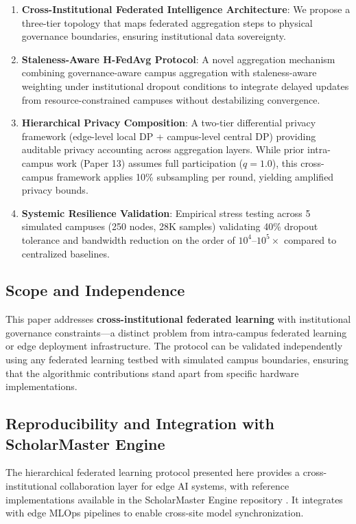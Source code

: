 \documentclass[conference]{IEEEtran}
\begin{document}
\begin{enumerate}
    \item \textbf{Cross-Institutional Federated Intelligence Architecture}: We propose a three-tier topology that maps federated aggregation steps to physical governance boundaries, ensuring institutional data sovereignty.
    \item \textbf{Staleness-Aware H-FedAvg Protocol}: A novel aggregation mechanism combining governance-aware campus aggregation with staleness-aware weighting under institutional dropout conditions to integrate delayed updates from resource-constrained campuses without destabilizing convergence.
    \item \textbf{Hierarchical Privacy Composition}: A two-tier differential privacy framework (edge-level local DP + campus-level central DP) providing auditable privacy accounting across aggregation layers. While prior intra-campus work (Paper 13) assumes full participation ($q=1.0$), this cross-campus framework applies 10\% subsampling per round, yielding amplified privacy bounds.
    \item \textbf{Systemic Resilience Validation}: Empirical stress testing across 5 simulated campuses (250 nodes, 28K samples) validating 40\% dropout tolerance and bandwidth reduction on the order of $10^4$--$10^5\times$ compared to centralized baselines.
\end{enumerate}

\subsection{Scope and Independence}
This paper addresses \textbf{cross-institutional federated learning} with institutional governance constraints---a distinct problem from intra-campus federated learning or edge deployment infrastructure. The protocol can be validated independently using any federated learning testbed with simulated campus boundaries, ensuring that the algorithmic contributions stand apart from specific hardware implementations.

\subsection{Reproducibility and Integration with ScholarMaster Engine}
The hierarchical federated learning protocol presented here provides a cross-institutional collaboration layer for edge AI systems, with reference implementations available in the ScholarMaster Engine repository \cite{scholarmaster_repo}. It integrates with edge MLOps pipelines to enable cross-site model synchronization.
\end{document}
